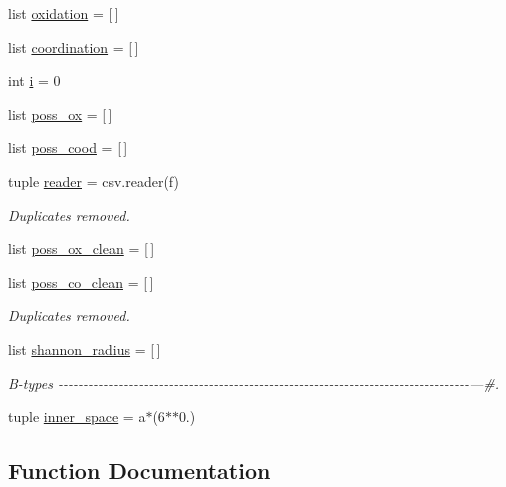 \begin{DoxyCompactItemize}
list \hyperlink{namespacesmact_1_1parameters_a14180ce62d67208c70ba3d513c19e6ca}{oxidation} = \mbox{[}$\,$\mbox{]}
\item 
list \hyperlink{namespacesmact_1_1parameters_a7823c63853e52a4e3204169fbec5217e}{coordination} = \mbox{[}$\,$\mbox{]}
\item 
int \hyperlink{namespacesmact_1_1parameters_a873ca6b8e0241804cc12ff4987d1a102}{i} = 0
\item 
list \hyperlink{namespacesmact_1_1parameters_a90bc30a9396fded6e78219dda2380290}{poss\+\_\+ox} = \mbox{[}$\,$\mbox{]}
\item 
list \hyperlink{namespacesmact_1_1parameters_a35421c1ebaf66b12a05908c56bc84e23}{poss\+\_\+cood} = \mbox{[}$\,$\mbox{]}
\item 
tuple \hyperlink{namespacesmact_1_1parameters_a3fdea3c0c08ebe498efc38f3c3cacb96}{reader} = csv.\+reader(f)
\begin{DoxyCompactList}\small\item\em Duplicates removed. \end{DoxyCompactList}\item 
list \hyperlink{namespacesmact_1_1parameters_a871efc9dce945c3476e9b4767745607e}{poss\+\_\+ox\+\_\+clean} = \mbox{[}$\,$\mbox{]}
\item 
list \hyperlink{namespacesmact_1_1parameters_a2f0606907d6627c0aa3f575ab28e6f6e}{poss\+\_\+co\+\_\+clean} = \mbox{[}$\,$\mbox{]}
\begin{DoxyCompactList}\small\item\em Duplicates removed. \end{DoxyCompactList}\item 
list \hyperlink{namespacesmact_1_1parameters_ac0c38ccc1997b7b2994407fd74c58e5a}{shannon\+\_\+radius} = \mbox{[}$\,$\mbox{]}
\begin{DoxyCompactList}\small\item\em B-\/types -\/-\/-\/-\/-\/-\/-\/-\/-\/-\/-\/-\/-\/-\/-\/-\/-\/-\/-\/-\/-\/-\/-\/-\/-\/-\/-\/-\/-\/-\/-\/-\/-\/-\/-\/-\/-\/-\/-\/-\/-\/-\/-\/-\/-\/-\/-\/-\/-\/-\/-\/-\/-\/-\/-\/-\/-\/-\/-\/-\/-\/-\/-\/-\/-\/-\/-\/-\/-\/-\/-\/-\/-\/-\/-\/-\/-\/-\/-\/-\/-\/-\/---\#. \end{DoxyCompactList}\item 
tuple \hyperlink{namespacesmact_1_1parameters_a4ca83f9b909f7195148ffd44a439bd16}{inner\+\_\+space} = a$\ast$(6$\ast$$\ast$0.)
\end{DoxyCompactItemize}


\subsection{Function Documentation}
\hypertarget{namespacesmact_1_1parameters_afca249beab0792afc200ee2fc1714fbe}{}

